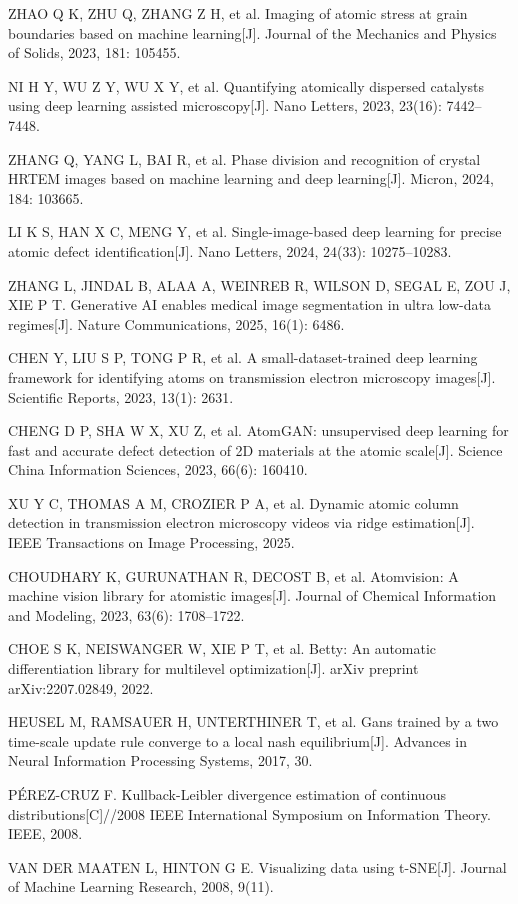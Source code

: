 ZHAO Q K, ZHU Q, ZHANG Z H, et al. Imaging of atomic stress at grain boundaries based on machine learning[J]. Journal of the Mechanics and Physics of Solids, 2023, 181: 105455.

NI H Y, WU Z Y, WU X Y, et al. Quantifying atomically dispersed catalysts using deep learning assisted microscopy[J]. Nano Letters, 2023, 23(16): 7442--7448.

ZHANG Q, YANG L, BAI R, et al. Phase division and recognition of crystal HRTEM images based on machine learning and deep learning[J]. Micron, 2024, 184: 103665.

LI K S, HAN X C, MENG Y, et al. Single-image-based deep learning for precise atomic defect identification[J]. Nano Letters, 2024, 24(33): 10275--10283.

ZHANG L, JINDAL B, ALAA A, WEINREB R, WILSON D, SEGAL E, ZOU J, XIE P T. Generative AI enables medical image segmentation in ultra low-data regimes[J]. Nature Communications, 2025, 16(1): 6486.

CHEN Y, LIU S P, TONG P R, et al. A small-dataset-trained deep learning framework for identifying atoms on transmission electron microscopy images[J]. Scientific Reports, 2023, 13(1): 2631.

CHENG D P, SHA W X, XU Z, et al. AtomGAN: unsupervised deep learning for fast and accurate defect detection of 2D materials at the atomic scale[J]. Science China Information Sciences, 2023, 66(6): 160410.

XU Y C, THOMAS A M, CROZIER P A, et al. Dynamic atomic column detection in transmission electron microscopy videos via ridge estimation[J]. IEEE Transactions on Image Processing, 2025.

CHOUDHARY K, GURUNATHAN R, DECOST B, et al. Atomvision: A machine vision library for atomistic images[J]. Journal of Chemical Information and Modeling, 2023, 63(6): 1708--1722.

CHOE S K, NEISWANGER W, XIE P T, et al. Betty: An automatic differentiation library for multilevel optimization[J]. arXiv preprint arXiv:2207.02849, 2022.

HEUSEL M, RAMSAUER H, UNTERTHINER T, et al. Gans trained by a two time-scale update rule converge to a local nash equilibrium[J]. Advances in Neural Information Processing Systems, 2017, 30.

PÉREZ-CRUZ F. Kullback-Leibler divergence estimation of continuous distributions[C]//2008 IEEE International Symposium on Information Theory. IEEE, 2008.

VAN DER MAATEN L, HINTON G E. Visualizing data using t-SNE[J]. Journal of Machine Learning Research, 2008, 9(11).


